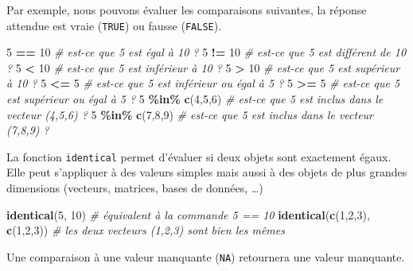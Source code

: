 \documentclass[
]{book}
\newenvironment{Shaded}{\begin{snugshade}}{\end{snugshade}}
\newcommand{\CommentTok}[1]{\textcolor[rgb]{0.56,0.35,0.01}{\textit{#1}}}
\newcommand{\DecValTok}[1]{\textcolor[rgb]{0.00,0.00,0.81}{#1}}
\newcommand{\FunctionTok}[1]{\textcolor[rgb]{0.13,0.29,0.53}{\textbf{#1}}}
\newcommand{\NormalTok}[1]{#1}
\newcommand{\SpecialCharTok}[1]{\textcolor[rgb]{0.81,0.36,0.00}{\textbf{#1}}}
\begin{document}
Par exemple, nous pouvons évaluer les comparaisons suivantes, la réponse attendue est vraie (\texttt{TRUE}) ou fausse (\texttt{FALSE}).

\begin{Shaded}
\begin{Highlighting}[]
\DecValTok{5} \SpecialCharTok{==} \DecValTok{10} \CommentTok{\# est{-}ce que 5 est égal à 10 ?}
\DecValTok{5} \SpecialCharTok{!=} \DecValTok{10} \CommentTok{\# est{-}ce que 5 est différent de 10 ?}
\DecValTok{5} \SpecialCharTok{\textless{}} \DecValTok{10} \CommentTok{\# est{-}ce que 5 est inférieur à 10 ?}
\DecValTok{5} \SpecialCharTok{\textgreater{}} \DecValTok{10} \CommentTok{\# est{-}ce que 5 est supérieur à 10 ?}
\DecValTok{5} \SpecialCharTok{\textless{}=} \DecValTok{5} \CommentTok{\# est{-}ce que 5 est inférieur ou égal à 5 ?}
\DecValTok{5} \SpecialCharTok{\textgreater{}=} \DecValTok{5} \CommentTok{\# est{-}ce que 5 est supérieur ou égal à 5 ?}
\DecValTok{5} \SpecialCharTok{\%in\%} \FunctionTok{c}\NormalTok{(}\DecValTok{4}\NormalTok{,}\DecValTok{5}\NormalTok{,}\DecValTok{6}\NormalTok{) }\CommentTok{\# est{-}ce que 5 est inclus dans le vecteur (4,5,6) ?}
\DecValTok{5} \SpecialCharTok{\%in\%} \FunctionTok{c}\NormalTok{(}\DecValTok{7}\NormalTok{,}\DecValTok{8}\NormalTok{,}\DecValTok{9}\NormalTok{) }\CommentTok{\# est{-}ce que 5 est inclus dans le vecteur (7,8,9) ?}
\end{Highlighting}
\end{Shaded}

La fonction \texttt{identical} permet d'évaluer si deux objets sont exactement égaux. Elle peut s'appliquer à des valeurs simples mais aussi à des objets de plus grandes dimensions (vecteurs, matrices, bases de données, \ldots)

\begin{Shaded}
\begin{Highlighting}[]
\FunctionTok{identical}\NormalTok{(}\DecValTok{5}\NormalTok{, }\DecValTok{10}\NormalTok{) }\CommentTok{\# équivalent à la commande 5 == 10}
\FunctionTok{identical}\NormalTok{(}\FunctionTok{c}\NormalTok{(}\DecValTok{1}\NormalTok{,}\DecValTok{2}\NormalTok{,}\DecValTok{3}\NormalTok{), }\FunctionTok{c}\NormalTok{(}\DecValTok{1}\NormalTok{,}\DecValTok{2}\NormalTok{,}\DecValTok{3}\NormalTok{)) }\CommentTok{\# les deux vecteurs (1,2,3) sont bien les mêmes}
\end{Highlighting}
\end{Shaded}

Une comparaison à une valeur manquante (\texttt{NA}) retournera une valeur manquante.
\end{document}
